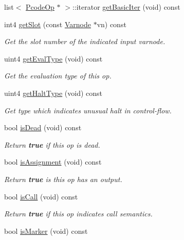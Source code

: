 \begin{DoxyCompactItemize}
list$<$ \mbox{\hyperlink{class_pcode_op}{Pcode\+Op}} $\ast$ $>$\+::iterator \mbox{\hyperlink{class_pcode_op_ae59d236d1cfac522cbf5f61a9f184753}{get\+Basic\+Iter}} (void) const
\item 
int4 \mbox{\hyperlink{class_pcode_op_a3bf80a4ef518e6a41cc0f0e8ae08e7b4}{get\+Slot}} (const \mbox{\hyperlink{class_varnode}{Varnode}} $\ast$vn) const
\begin{DoxyCompactList}\small\item\em Get the slot number of the indicated input varnode. \end{DoxyCompactList}\item 
uint4 \mbox{\hyperlink{class_pcode_op_aad460cabfdd49e554f3c28e44cbce3e1}{get\+Eval\+Type}} (void) const
\begin{DoxyCompactList}\small\item\em Get the evaluation type of this op. \end{DoxyCompactList}\item 
uint4 \mbox{\hyperlink{class_pcode_op_af4f85b05be28b424b0dccf3646029eb9}{get\+Halt\+Type}} (void) const
\begin{DoxyCompactList}\small\item\em Get type which indicates unusual halt in control-\/flow. \end{DoxyCompactList}\item 
bool \mbox{\hyperlink{class_pcode_op_a6b24e6d10c6a0cde774cf52e816a636d}{is\+Dead}} (void) const
\begin{DoxyCompactList}\small\item\em Return {\bfseries{true}} if this op is dead. \end{DoxyCompactList}\item 
bool \mbox{\hyperlink{class_pcode_op_ab4b60782c2177bffc1f07d96ea2feef8}{is\+Assignment}} (void) const
\begin{DoxyCompactList}\small\item\em Return {\bfseries{true}} is this op has an output. \end{DoxyCompactList}\item 
bool \mbox{\hyperlink{class_pcode_op_a3dabd80d764bec27a069d40b3bac3c9d}{is\+Call}} (void) const
\begin{DoxyCompactList}\small\item\em Return {\bfseries{true}} if this op indicates call semantics. \end{DoxyCompactList}\item 
bool \mbox{\hyperlink{class_pcode_op_a9c76c2a8179e91146c4f382bd0c420d5}{is\+Marker}} (void) const

\end{DoxyCompactItemize}
